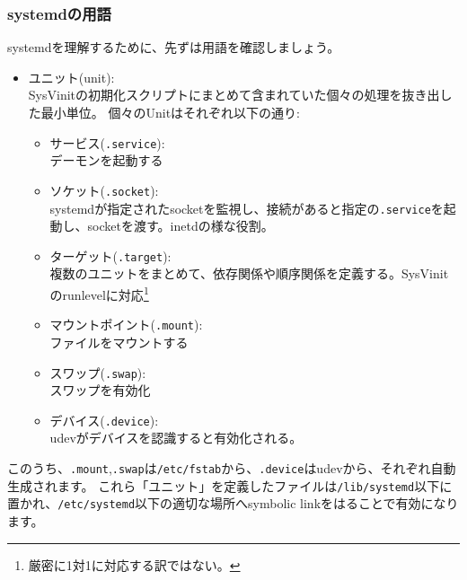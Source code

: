 \documentclass[mingoth,a4paper]{jsarticle}
\begin{document}
\subsubsection{systemdの用語}
systemdを理解するために、先ずは用語を確認しましょう。
\begin{itemize}
\item ユニット(unit): \\
  SysVinitの初期化スクリプトにまとめて含まれていた個々の処理を抜き出した最小単位。
  個々のUnitはそれぞれ以下の通り:
  \begin{itemize}
  \item サービス(\texttt{.service}): \\
    デーモンを起動する
  \item ソケット(\texttt{.socket}): \\
    systemdが指定されたsocketを監視し、接続があると指定の\texttt{.service}を起動し、socketを渡す。inetdの様な役割。
  \item ターゲット(\texttt{.target}):\\
    複数のユニットをまとめて、依存関係や順序関係を定義する。SysVinitのrunlevelに対応\footnote{%
      厳密に1対1に対応する訳ではない。%
    }
  \item マウントポイント(\texttt{.mount}): \\
    ファイルをマウントする
  \item スワップ(\texttt{.swap}): \\
    スワップを有効化
  \item デバイス(\texttt{.device}): \\
    udevがデバイスを認識すると有効化される。
  \end{itemize}
\end{itemize}
このうち、\texttt{.mount},\texttt{.swap}は\texttt{/etc/fstab}から、\texttt{.device}はudevから、それぞれ自動生成されます。
これら「ユニット」を定義したファイルは\texttt{/lib/systemd}以下に置かれ、\texttt{/etc/systemd}以下の適切な場所へsymbolic linkをはることで有効になります。
\end{document}
